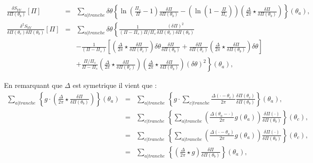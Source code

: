 	\begin{eqnarray}
			\frac{ \delta S_{YY} }{ \delta \Pi(\theta_b)} [\Pi ]  & = & \sum_{a\vert tranche}   \delta \theta \left \{ \ln \left ( \frac{ \Pi_s }{ \Pi} - 1 \right )\frac{\delta \Pi }{ \delta \Pi (\theta_b) } -  \left ( \ln \left ( 1 - \frac{ \Pi}{ \Pi_s}\right ) \right ) \left ( \frac{ \Delta}{2 \pi} \star \frac{\delta \Pi }{ \delta \Pi(\theta_b) }  \right) \right \} ( \theta_	a ),\\
			\frac{ \delta^2 S_{YY} }{ \delta \Pi(\theta_c) \delta \Pi(\theta_b)  } [\Pi ]  & = & \sum_{a \vert tranche}   \delta \theta \left \{  \frac{1}{(\Pi  - \Pi_s)\Pi/\Pi_s} \frac{(\delta \Pi)^2}{ \delta \Pi(\theta_c) \delta \Pi(\theta_b)  } \right . \\
		&  &  -  \left . \frac{1 }{(\Pi -\Pi_s) } \left [ \left (  \frac{\Delta}{2\pi} \star\frac{\delta \Pi}{\delta \Pi(\theta_c)}   \right )   \delta \theta \frac{\delta \Pi}{\delta \Pi(\theta_b)}+ \frac{\delta \Pi}{\delta \Pi(\theta_c)} \left (  \frac{\Delta}{2\pi} \star\frac{\delta \Pi}{\delta \Pi(\theta_b)} \right )  \delta \theta  \right ] \right . \\
		& & + \left .  \frac{\Pi/\Pi_s }{\Pi - \Pi_s }\left (  \frac{\Delta}{2\pi} \star\frac{\delta \Pi}{\delta \Pi(\theta_c)} \right )\left (  \frac{\Delta}{2\pi} \star\frac{\delta \Pi}{\delta \Pi(\theta_b)} \right )   (\delta \theta)^2 \right \}(\theta_a),	
	\end{eqnarray}
	
%	
		
		En remarquant que $\Delta$ est symetrique il vient que : 
	\begin{eqnarray}
		\sum_{a\vert tranche}   \,  \left \{ g  \cdot  	\left  ( \frac{\Delta}{2\pi} \star  \frac{\delta \Pi}{\delta \Pi(\theta_b)} \right ) \right \}( \theta_a) & = & \sum_{a\vert tranche}   \,  \left \{ g  \cdot  \sum_{c\vert tranche}    	
		 \frac{\Delta ( \cdot - \theta_c)}{2\pi}  \frac{\delta \Pi (\theta_c) }{\delta \Pi(\theta_b)}\right \}( \theta_a),\\
		 & = & \sum_{c\vert tranche}   \,  \left \{  \sum_{a\vert tranche}      	
		  \left ( \frac{\Delta ( \theta_a - \cdot )}{2\pi}  g ( \theta_a) \right ) \frac{\delta \Pi (\cdot) }{\delta \Pi(\theta_b)}\right \}( \theta_c),\\
		  & = & \sum_{c\vert tranche}  \,  \left \{  \sum_{a\vert tranche}      	
		  \left ( \frac{\Delta ( \cdot - \theta_a)}{2\pi}  g ( \theta_a) \right ) \frac{\delta \Pi (\cdot) }{\delta \Pi(\theta_b)}\right \}( \theta_c),\\
		  & = & \sum_{a\vert tranche}   \,  \left \{        	
		  \left ( \frac{\Delta}{2\pi}   \star g \right ) \frac{\delta \Pi  }{\delta \Pi(\theta_b)}\right \}( \theta_a),\\
	\end{eqnarray}	
	
